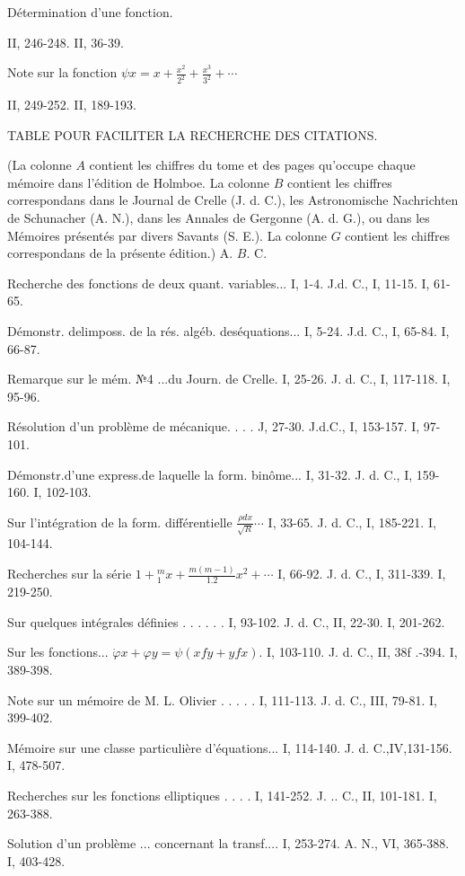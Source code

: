 \documentclass{article}
\begin{document}
Détermination d'une fonction.

II, 246-248. II, 36-39.

Note sur la fonction \(\psi x=x+\frac{x^{2}}{2^{2}}+\frac{x^{3}}{3^{2}}+\cdots\)

II, 249-252. II, 189-193.

TABLE POUR FACILITER LA RECHERCHE DES CITATIONS.

(La colonne \(A\) contient les chiffres du tome et des pages qu'occupe chaque mémoire dans l'édition de Holmboe. La colonne \(B\) contient les chiffres correspondans dans le Journal de Crelle (J. d. C.), les Astronomische Nachrichten de Schunacher (A. N.), dans les Annales de Gergonne (A. d. G.), ou dans les Mémoires présentés par divers Savants (S. E.). La colonne \(G\) contient les chiffres correspondans de la présente édition.)
A.
\(B\).
C.

Recherche des fonctions de deux quant. variables... I, 1-4. J.d. C., I, 11-15. I, 61-65.

Démonstr. delimposs. de la rés. algéb. deséquations... I, 5-24. J.d. C., I, 65-84. I, 66-87.

Remarque sur le mém. №4 ...du Journ. de Crelle. I, 25-26. J. d. C., I, 117-118. I, 95-96.

Résolution d'un problème de mécanique. . . . J, 27-30. J.d.C., I, 153-157. I, 97-101.

Démonstr.d'une express.de laquelle la form. binôme... I, 31-32. J. d. C., I, 159-160. I, 102-103.

Sur l'intégration de la form. différentielle \(\frac{\rho d x}{\sqrt{R}} \cdots\) I, 33-65. J. d. C., I, 185-221. I, 104-144.

Recherches sur la série \(1+{ }_{1}^{m} x+\frac{m(m-1)}{1.2} x^{2}+\cdots\) I, 66-92. J. d. C., I, 311-339. I, 219-250.

Sur quelques intégrales définies . . . . . . I, 93-102. J. d. C., II, 22-30. I, 201-262.

Sur les fonctions... \(\dot{\varphi} x+\varphi y=\psi(x f y+y f x)\). I, 103-110. J. d. C., II, 38f .-394. I, 389-398.

Note sur un mémoire de M. L. Olivier . . . . . I, 111-113. J. d. C., III, 79-81. I, 399-402.

Mémoire sur une classe particulière d'équations... I, 114-140. J. d. C.,IV,131-156. I, 478-507.

Recherches sur les fonctions elliptiques . . . . I, 141-252. J. .. C., II, 101-181. I, 263-388.

Solution d'un problème ... concernant la transf.... I, 253-274. A. N., VI, 365-388. I, 403-428.
\end{document}
